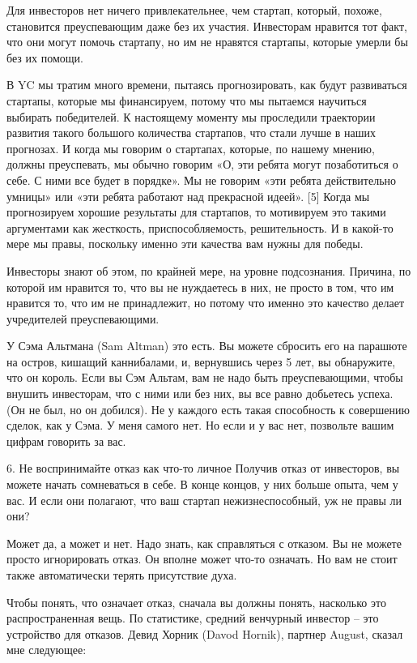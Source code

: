 \documentclass[ebook,12pt,oneside,openany]{memoir}
\begin{document}
Для инвесторов нет ничего привлекательнее, чем стартап, который,
похоже, становится преуспевающим даже без их участия. Инвесторам
нравится тот факт, что они могут помочь стартапу, но им не нравятся
стартапы, которые умерли бы без их помощи.

В YC мы тратим много времени, пытаясь прогнозировать, как будут
развиваться стартапы, которые мы финансируем, потому что мы пытаемся
научиться выбирать победителей. К настоящему моменту мы проследили
траектории развития такого большого количества стартапов, что стали
лучше в наших прогнозах. И когда мы говорим о стартапах, которые, по
нашему мнению, должны преуспевать, мы обычно говорим «О, эти ребята
могут позаботиться о себе. С ними все будет в порядке». Мы не говорим
«эти ребята действительно умницы» или «эти ребята работают над
прекрасной идеей». [5] Когда мы прогнозируем хорошие результаты для
стартапов, то мотивируем это такими аргументами как жесткость,
приспособляемость, решительность. И в какой-то мере мы правы,
поскольку именно эти качества вам нужны для победы.

Инвесторы знают об этом, по крайней мере, на уровне подсознания.
Причина, по которой им нравится то, что вы не нуждаетесь в них, не
просто в том, что им нравится то, что им не принадлежит, но потому что
именно это качество делает учредителей преуспевающими.

У Сэма Альтмана (Sam Altman) это есть. Вы можете сбросить его на
парашюте на остров, кишащий каннибалами, и, вернувшись через 5 лет, вы
обнаружите, что он король. Если вы Сэм Альтам, вам не надо быть
преуспевающими, чтобы внушить инвесторам, что с ними или без них, вы
все равно добьетесь успеха. (Он не был, но он добился). Не у каждого
есть такая способность к совершению сделок, как у Сэма. У меня самого
нет. Но если и у вас нет, позвольте вашим цифрам говорить за вас.

6. Не воспринимайте отказ как что-то личное Получив отказ от
инвесторов, вы можете начать сомневаться в себе. В конце концов, у них
больше опыта, чем у вас. И если они полагают, что ваш стартап
нежизнеспособный, уж не правы ли они?

Может да, а может и нет. Надо знать, как справляться с отказом. Вы не
можете просто игнорировать отказ. Он вполне может что-то означать. Но
вам не стоит также автоматически терять присутствие духа.

Чтобы понять, что означает отказ, сначала вы должны понять, насколько
это распространенная вещь. По статистике, средний венчурный инвестор –
это устройство для отказов. Девид Хорник (Davod Hornik), партнер
August, сказал мне следующее:
\end{document}
